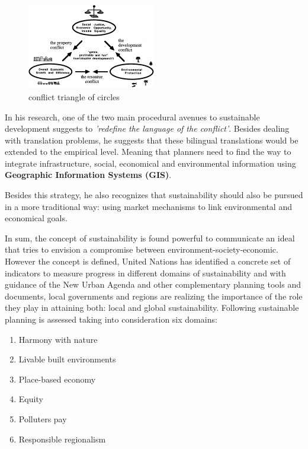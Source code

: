 \begin{figure}[h!]
    \centering
    \includegraphics[width=0.5\textwidth]{sections/asset/sdg_conflicts.PNG}
    \caption{conflict triangle of circles}
    \label{fig:sustainable_conflicts}
\end{figure}


In his research, one of the two main procedural avenues to sustainable development suggests to \textit{'redefine the language of the conflict'}. Besides dealing with translation problems, he suggests that these bilingual translations would be extended to the empirical level. Meaning that planners need to find the way to integrate infrastructure, social, economical and environmental information using \textbf{Geographic Information Systems (GIS)}. \par
Besides this strategy, he also recognizes that sustainability should also be pursued in a more traditional way: using market mechanisms to link environmental and economical goals.\par

In sum, the concept of sustainability is found powerful to communicate an ideal that tries to envision a compromise between environment-society-economic. However the concept is defined, United Nations has identified a concrete set of indicators to measure progress in different domains of sustainability and with guidance of the New Urban Agenda and other complementary planning tools and documents, local governments and regions are realizing the importance of the role they play in attaining both: local and global sustainability. Following \textcite{Berke2000} sustainable planning is assessed taking into consideration six domains:\par


\begin{enumerate}
    \item Harmony with nature
    \item Livable built environments
    \item Place-based economy
    \item Equity
    \item Polluters pay
    \item Responsible regionalism
\end{enumerate}


